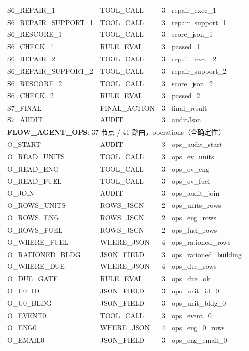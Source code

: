 {\begin{longtable}{p{5.0cm}p{3.1cm}p{1.0cm}p{5.0cm}}
S6\_REPAIR\_1 & TOOL\_CALL & 3 & repair\_exec\_1 \\
S6\_REPAIR\_SUPPORT\_1 & TOOL\_CALL & 3 & repair\_support\_1 \\
S6\_RESCORE\_1 & TOOL\_CALL & 3 & score\_json\_1 \\
S6\_CHECK\_1 & RULE\_EVAL & 3 & passed\_1 \\
S6\_REPAIR\_2 & TOOL\_CALL & 3 & repair\_exec\_2 \\
S6\_REPAIR\_SUPPORT\_2 & TOOL\_CALL & 3 & repair\_support\_2 \\
S6\_RESCORE\_2 & TOOL\_CALL & 3 & score\_json\_2 \\
S6\_CHECK\_2 & RULE\_EVAL & 3 & passed\_2 \\
S7\_FINAL & FINAL\_ACTION & 3 & final\_result \\
S7\_AUDIT & AUDIT & 3 & auditJson \\
\midrule
\multicolumn{4}{l}{\textbf{FLOW\_AGENT\_OPS}: 37 节点 / 41 路由，operations（全确定性）} \\
\midrule
O\_START & AUDIT & 3 & ops\_audit\_start \\
O\_READ\_UNITS & TOOL\_CALL & 3 & ops\_ev\_units \\
O\_READ\_ENG & TOOL\_CALL & 3 & ops\_ev\_eng \\
O\_READ\_FUEL & TOOL\_CALL & 3 & ops\_ev\_fuel \\
O\_JOIN & AUDIT & 3 & ops\_audit\_join \\
O\_ROWS\_UNITS & ROWS\_JSON & 2 & ops\_units\_rows \\
O\_ROWS\_ENG & ROWS\_JSON & 2 & ops\_eng\_rows \\
O\_ROWS\_FUEL & ROWS\_JSON & 2 & ops\_fuel\_rows \\
O\_WHERE\_FUEL & WHERE\_JSON & 4 & ops\_rationed\_rows \\
O\_RATIONED\_BLDG & JSON\_FIELD & 3 & ops\_rationed\_building \\
O\_WHERE\_DUE & WHERE\_JSON & 4 & ops\_due\_rows \\
O\_DUE\_GATE & RULE\_EVAL & 3 & ops\_due\_ok \\
O\_U0\_ID & JSON\_FIELD & 3 & ops\_unit\_id\_0 \\
O\_U0\_BLDG & JSON\_FIELD & 3 & ops\_unit\_bldg\_0 \\
O\_EVENT0 & TOOL\_CALL & 3 & ops\_event\_0 \\
O\_ENG0 & WHERE\_JSON & 4 & ops\_eng\_0\_rows \\
O\_EMAIL0 & JSON\_FIELD & 3 & ops\_eng\_email\_0 \\

\end{longtable}}
